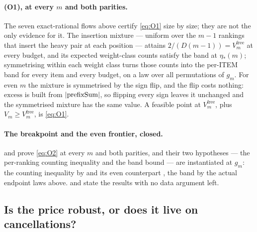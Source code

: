 \paragraph{(O1), at every $m$ and both parities.}
The seven exact-rational flows above certify \eqref{eq:O1} size by size; they are not
the only evidence for it. The insertion mixture --- uniform over the $m-1$ rankings that
insert the heavy pair at each position --- attains $2/(D(m-1))=V^{\mathrm{free}}_{m}$ at
every budget, and its expected weight-class counts satisfy the band at $\eta_{*}(m)$;
symmetrising within each weight class turns those counts into the per-ITEM band for every
item and every budget, on a law over all permutations of $g_{m}$. For even $m$ the
mixture is symmetrised by the sign flip, and the flip costs nothing: $\mathrm{excess}$ is
built from $|{\rm prefixSum}|$, so flipping every sign leaves it unchanged and the
symmetrised mixture has the same value. A feasible point at $V^{\mathrm{free}}_{m}$, plus
$V_{m}\ge V^{\mathrm{free}}_{m}$, is \eqref{eq:O1}.


\paragraph{The breakpoint and the even frontier, closed.}
 and  prove \eqref{eq:O2} at every $m$ and
both parities, and their two hypotheses --- the per-ranking counting inequality and the band
bound --- are instantiated at $g_{m}$: the counting inequality by 
and its even counterpart , the band by the actual endpoint laws
above.  and  state the results with no data
argument left.


\subsection{Is the price robust, or does it live on cancellations?}
\label{sec:robust}

